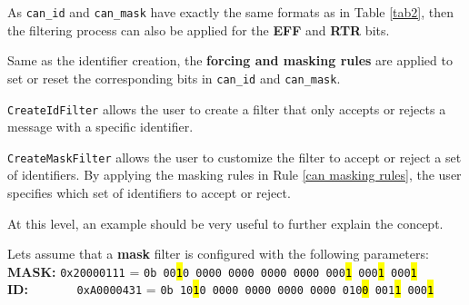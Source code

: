 \captionsetup{type=rule}
\label{can masking rules}



\setlength{\parindent}{0.5cm} %

As \texttt{can\_id} and \texttt{can\_mask} have exactly the same formats as in Table \ref{tab2}, then the filtering process can also be applied for the \textbf{EFF} and \textbf{RTR} bits.

Same as the identifier creation, the \textbf{forcing and masking rules} are applied to set or reset the corresponding bits in \texttt{can\_id} and \texttt{can\_mask}.

\texttt{CreateIdFilter} allows the user to create a filter that only accepts or rejects a message with a specific identifier.

\texttt{CreateMaskFilter} allows the user to customize the filter to accept or reject a set of identifiers. By applying the masking rules in Rule \ref{can masking rules}, the user specifies which set of identifiers to accept or reject.

At this level, an example should be very useful to further explain the concept.

Lets assume that a \textbf{mask} filter is configured with the following parameters:
\\
\textbf{MASK:} \texttt{0x20000111} = \texttt{0b 00\hl{1}0 0000 0000 0000 0000 000\hl{1} 000\hl{1} 000\hl{1}}
\\
\textbf{ID:}~~~~~~~ \texttt{0xA0000431} =   \texttt{0b 10\hl{1}0 0000 0000 0000 0000 010\hl{0} 001\hl{1} 000\hl{1}}


